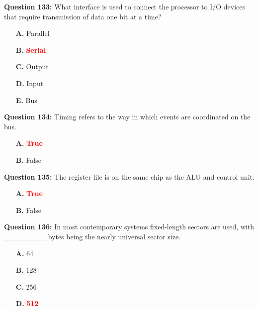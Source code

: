 \documentclass[12pt,a4paper]{article}
\begin{document}
\vspace{0.5cm}

\textbf{Question 133:} What interface is used to connect the processor to I/O devices that require transmission of data one bit at a time?

\begin{itemize}
    \item[\textbf{A.}] Parallel
    \item[\textbf{B.}] \textcolor{red}{\textbf{Serial}}
    \item[\textbf{C.}] Output
    \item[\textbf{D.}] Input
    \item[\textbf{E.}] Bus
\end{itemize}

\vspace{0.5cm}

\textbf{Question 134:} Timing refers to the way in which events are coordinated on the bus.

\begin{itemize}
    \item[\textbf{A.}] \textcolor{red}{\textbf{True}}
    \item[\textbf{B.}] False
\end{itemize}

\vspace{0.5cm}

\textbf{Question 135:} The register file is on the same chip as the ALU and control unit.

\begin{itemize}
    \item[\textbf{A.}] \textcolor{red}{\textbf{True}}
    \item[\textbf{B.}] False
\end{itemize}

\vspace{0.5cm}

\textbf{Question 136:} In most contemporary systems fixed-length sectors are used, with ________ bytes being the nearly universal sector size.

\begin{itemize}
    \item[\textbf{A.}] 64
    \item[\textbf{B.}] 128
    \item[\textbf{C.}] 256
    \item[\textbf{D.}] \textcolor{red}{\textbf{512}}
\end{itemize}
\end{document}
